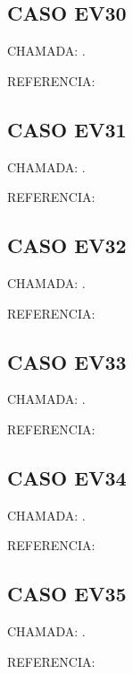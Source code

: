 \documentclass{undftex}
\begin{document}
\begin{refsection}\section*{CASO EV30} CHAMADA: . \textcite{ev30}\par REFERENCIA:\par\printbibliography[heading=none,check=undfconsultadas]\end{refsection}\clearpage
\begin{refsection}\section*{CASO EV31} CHAMADA: . \textcite{ev31}\par REFERENCIA:\par\printbibliography[heading=none,check=undfconsultadas]\end{refsection}\clearpage
\begin{refsection}\section*{CASO EV32} CHAMADA: . \textcite{ev32}\par REFERENCIA:\par\printbibliography[heading=none,check=undfconsultadas]\end{refsection}\clearpage
\begin{refsection}\section*{CASO EV33} CHAMADA: . \textcite{ev33}\par REFERENCIA:\par\printbibliography[heading=none,check=undfconsultadas]\end{refsection}\clearpage
\begin{refsection}\section*{CASO EV34} CHAMADA: . \textcite{ev34}\par REFERENCIA:\par\printbibliography[heading=none,check=undfconsultadas]\end{refsection}\clearpage
\begin{refsection}\section*{CASO EV35} CHAMADA: . \textcite{ev35}\par REFERENCIA:\par\printbibliography[heading=none,check=undfconsultadas]\end{refsection}\clearpage
\end{document}
